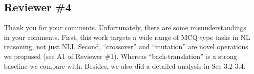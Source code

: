 \documentclass[letterpaper]{article}
\begin{document}
\subsection{Reviewer \#4}
Thank you for your comments. 
Unfortunately, there are some misunderstandings in your comments.
First, this work targets a wide range of MCQ type tasks in NL reasoning, not just NLI. 
Second, ``crossover'' and ``mutation'' are novel operations we proposed (see A1 of Reviewer \#1). 
Whereas ``back-translation'' is a strong baseline we compare with.
Besides, we also did a detailed analysis in Sec 3.2-3.4.
\end{document}
